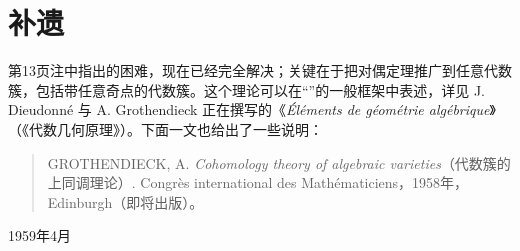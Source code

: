 \section*{补遗}
第13页注中指出的困难，现在已经完全解决；关键在于把对偶定理推广到任意代数簇，包括带任意奇点的代数簇。这个理论可以在“”的一般框架中表述，详见 J. Dieudonné 与 A. Grothendieck 正在撰写的《\emph{Éléments de géométrie algébrique}》（《代数几何原理》）。下面一文也给出了一些说明：
\begin{quote}
GROTHENDIECK, A. \emph{Cohomology theory of algebraic varieties}（代数簇的上同调理论）. Congrès international des Mathématiciens，1958年，Edinburgh（即将出版）。
\end{quote}
\begin{flushright}1959年4月\end{flushright}
